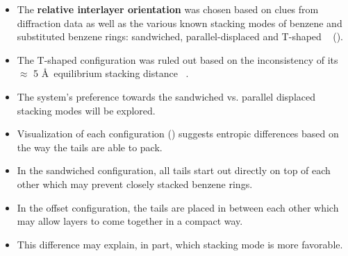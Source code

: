 \documentclass{article}
\newcommand{\angstrom}{\textup{\AA}}
\begin{document}
  \begin{itemize}
    \item The \textbf{relative interlayer orientation} was chosen based on clues from 
    diffraction data as well as the various known stacking modes of benzene 
    and substituted benzene rings: sandwiched, parallel-displaced and T-shaped
    ~\cite{sinnokrot_estimates_2002} ().
    \item The T-shaped configuration was ruled out based on the inconsistency of
    its $\approx$ 5 \angstrom~equilibrium stacking distance ~\cite{sinnokrot_estimates_2002}.
    \item The system's preference towards the sandwiched vs. parallel displaced 
    stacking modes will be explored.
    \item Visualization of each configuration ()
    suggests entropic differences based on the way the tails are able to pack.
    \item In the sandwiched configuration, all tails start out directly on top
    of each other which may prevent closely stacked benzene rings.
    \item In the offset configuration, the tails are placed in between each other 
    which may allow layers to come together in a compact way.
    \item This difference may explain, in part, which stacking mode is more favorable.
  \end{itemize}
\end{document}
